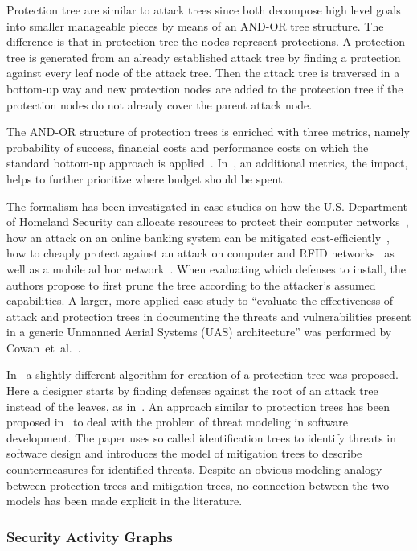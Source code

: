\documentclass[a4paper]{article}
\begin{document}
Protection tree are similar to attack trees since both decompose high level
goals into smaller manageable pieces by means of an AND-OR tree structure. The
difference is that in protection tree the nodes represent protections. A
protection tree is generated from an already established attack tree by finding
a protection against every leaf node of the attack tree. Then the attack tree is
traversed in a bottom-up way and new protection nodes are added to the
protection tree if the protection nodes do not already cover the parent attack
node.

The AND-OR structure of protection trees is enriched with three metrics, namely
probability of success, financial costs and performance costs on which the
standard bottom-up approach is applied~\cite{EdDaRaMi,EdRaGrBaBeRe,Edge}.
In~\cite{DaEdMiRa}, an additional  metrics, the impact, helps to further
prioritize where budget should be spent.

The formalism has been investigated in case studies on how the U.S. Department
of Homeland Security can allocate resources to protect their computer
networks~\cite{EdDaRaMi}, how an attack on an online banking system can be
mitigated cost-efficiently~\cite{EdRaGrBaBeRe}, how to cheaply protect against
an attack on computer and RFID networks~\cite{DaEdMiRa} as well as a mobile ad
hoc network~\cite{Edge}. When evaluating which defenses to install, the authors
propose to first prune the tree according to the attacker's assumed
capabilities. A larger, more applied case study to ``evaluate the effectiveness
of attack and protection trees in documenting the threats and vulnerabilities
present in a generic Unmanned Aerial Systems (UAS) architecture'' was performed
by Cowan~et~al.~\cite{CoGrPa}.

In~\cite{EdRaGrBaBeRe} a slightly different algorithm for creation of a
protection tree was proposed. Here a designer starts by finding defenses against
the root of an attack tree instead of the leaves, as in~\cite{EdDaRaMi,Edge}. An
approach similar to protection trees has been proposed in~\cite{RuHeCeMi} to
deal with the problem of threat modeling in software development. The paper uses
so called identification trees to identify threats in software design and
introduces the model of mitigation trees to describe countermeasures for
identified threats. Despite an obvious modeling analogy between protection 
trees and mitigation trees, no connection between the two models has been made 
explicit in the literature.

\subsubsection{Security Activity Graphs} 
\label{sec:security_activity_graphs}
\end{document}
